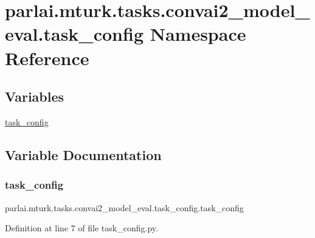\hypertarget{namespaceparlai_1_1mturk_1_1tasks_1_1convai2__model__eval_1_1task__config}{}\section{parlai.\+mturk.\+tasks.\+convai2\+\_\+model\+\_\+eval.\+task\+\_\+config Namespace Reference}
\label{namespaceparlai_1_1mturk_1_1tasks_1_1convai2__model__eval_1_1task__config}
\subsection*{Variables}
\begin{DoxyCompactItemize}
\item 
\hyperlink{namespaceparlai_1_1mturk_1_1tasks_1_1convai2__model__eval_1_1task__config_abc274ac825f6cff86523283290108e62}{task\+\_\+config}
\end{DoxyCompactItemize}


\subsection{Variable Documentation}
\mbox{\label{namespaceparlai_1_1mturk_1_1tasks_1_1convai2__model__eval_1_1task__config_abc274ac825f6cff86523283290108e62}} 
\subsubsection{\texorpdfstring{task\+\_\+config}{task\_config}}
{\footnotesize\ttfamily parlai.\+mturk.\+tasks.\+convai2\+\_\+model\+\_\+eval.\+task\+\_\+config.\+task\+\_\+config}



Definition at line 7 of file task\+\_\+config.\+py.

